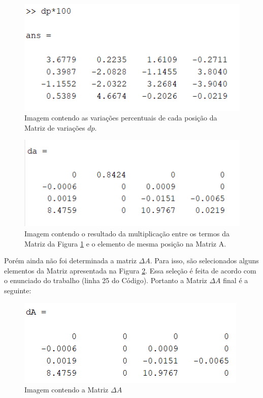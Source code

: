 \documentclass[a4paper,12pt]{article}
\begin{document}
\begin{figure}[!h]
  \hspace*{-1cm} 
  \includegraphics[width=8 cm]{MatrizIncerteza.png}
  \centering
  \caption{Imagem contendo as variações percentuais de cada posição da Matriz de variações $dp$.}
  \label{MatrizdeVariacoes}
\end{figure}

\clearpage

\begin{figure}[!h]
  \hspace*{-1cm} 
  \includegraphics[width=8 cm]{MatrizDeltaAInicial.png}  
  \centering
  \caption{Imagem contendo o resultado da multiplicação entre os termos da Matriz da Figura \ref{MatrizdeVariacoes} e o elemento de mesma posição na Matriz A.}
  \label{MatrizDeltaINICIAL}
\end{figure}


Porém ainda não foi determinada a matriz $\Delta A$. Para isso, são selecionados alguns elementos da Matriz apresentada na Figura \ref{MatrizDeltaINICIAL}. Essa seleção é feita de acordo com o enunciado do trabalho (linha 25 do Código). Portanto a Matriz $\Delta A$ final é a seguinte:

\begin{figure}[!h]
  \hspace*{-1cm} 
  \includegraphics[width=8 cm]{MatrizDeltaA.png}
  \centering
  \caption{Imagem contendo a Matriz $\Delta A$}
  \label{MatrizDeltaA}
\end{figure}
\end{document}
